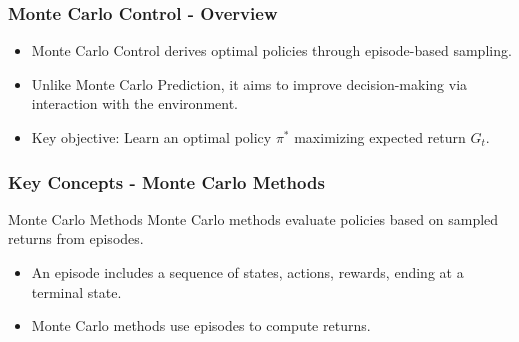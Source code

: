 \documentclass[aspectratio=169]{beamer}
\begin{document}
\begin{frame}[fragile]
    \frametitle{Monte Carlo Control - Overview}
    \begin{itemize}
        \item Monte Carlo Control derives optimal policies through episode-based sampling.
        \item Unlike Monte Carlo Prediction, it aims to improve decision-making via interaction with the environment.
        \item Key objective: Learn an optimal policy \( \pi^* \) maximizing expected return \( G_t \).
    \end{itemize}
\end{frame}

\begin{frame}[fragile]
    \frametitle{Key Concepts - Monte Carlo Methods}
    \begin{block}{Monte Carlo Methods}
        Monte Carlo methods evaluate policies based on sampled returns from episodes.
    \end{block}
    
    \begin{itemize}
        \item An episode includes a sequence of states, actions, rewards, ending at a terminal state.
        \item Monte Carlo methods use episodes to compute returns.
    \end{itemize}
\end{frame}
\end{document}
